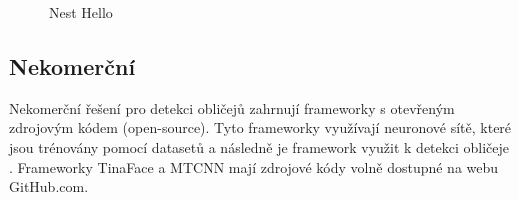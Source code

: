 \begin{figure}[H]
  \begin{center}
  \label{nest}
  \caption{Nest Hello \cite{securityCamsWeb2}}
  \end{center}
\end{figure}

\subsection*{Nekomerční}
Nekomerční řešení pro detekci obličejů zahrnují frameworky s otevřeným zdrojovým
kódem (open-source). Tyto frameworky využívají neuronové sítě, které jsou trénovány
pomocí datasetů a následně je framework využit k detekci obličeje 
\cite{faceRecognitionFrameworks}.
Frameworky TinaFace \cite{TinaFace} a MTCNN \cite{MTCNN} mají zdrojové kódy
volně dostupné na webu GitHub.com.






